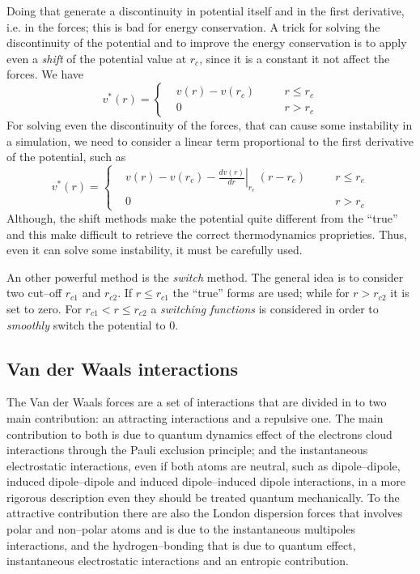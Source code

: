 Doing that generate a discontinuity in potential itself and in the first derivative, i.e. in the forces; this is bad for energy conservation. A trick for solving the discontinuity of the potential and to improve the energy conservation is to apply even a \textit{shift} of the potential value at $r_c$, since it is a constant it not affect the forces. We have
\begin{equation*}
v^*(r) = \left \{
	\begin{aligned}
&v(r) - v(r_c) & \quad & r \le r_c \\
&0    & \quad  & r >   r_c
	\end{aligned} \right .
\end{equation*}
For solving even the discontinuity of the forces, that can cause some instability in a simulation, we need to consider a linear term proportional to the first derivative of the potential, such as
\begin{equation*}
v^*(r) = \left \{
	\begin{aligned}
&v(r) - v(r_c) - \left . \frac{dv(r)}{dr}\right |_{r_c}\ (r - r_c) & \quad & r \le r_c \\
&0    & \quad  & r >   r_c
	\end{aligned} \right .
\end{equation*}
Although, the shift methods make the potential quite different from the ``true'' and this make difficult to retrieve the correct thermodynamics proprieties. Thus, even it can solve some instability, it must be carefully used.

An other powerful method is the \textit{switch} method. The general idea is to consider two cut--off $r_{c1}$ and $r_{c2}$. If $r \le r_{c1}$ the ``true'' forms are used; while for $r > r_{c2}$ it is set to zero. For $r_{c1} < r \le r_{c2}$ a \textit{switching functions} is considered in order to \textit{smoothly} switch the potential to $0$.

\subsection{Van der Waals interactions}
The Van der Waals forces are a set of interactions that are divided in to two main contribution: an attracting interactions and a repulsive one. The main contribution to both is due to quantum dynamics effect of the electrons cloud interactions through the Pauli exclusion principle; and the instantaneous electrostatic interactions, even if both atoms are neutral, such as dipole--dipole, induced dipole--dipole and induced dipole--induced dipole interactions, in a more rigorous description even they should be treated quantum mechanically. To the attractive contribution there are also the London dispersion forces that involves polar and non--polar atoms and is due to the instantaneous multipoles interactions, and the hydrogen--bonding that is due to quantum effect, instantaneous electrostatic interactions and an entropic contribution.


